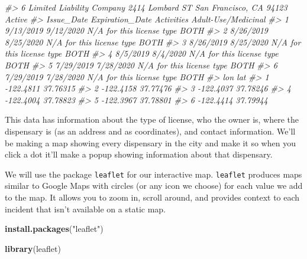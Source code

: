 \documentclass[
  12pt,
]{book}
\newenvironment{Shaded}{\begin{snugshade}}{\end{snugshade}}
\newcommand{\CommentTok}[1]{\textcolor[rgb]{0.37,0.37,0.37}{\textit{#1}}}
\newcommand{\KeywordTok}[1]{\textcolor[rgb]{0.27,0.27,0.27}{\textbf{#1}}}
\newcommand{\NormalTok}[1]{#1}
\newcommand{\StringTok}[1]{\textcolor[rgb]{0.5,0.5,0.5}{#1}}
\begin{document}
\begin{Shaded}
\begin{Highlighting}[]
\CommentTok{\#\textgreater{} 6 Limited Liability Company 2414 Lombard ST San Francisco, CA 94123 Active}
\CommentTok{\#\textgreater{}   Issue\_Date Expiration\_Date                Activities Adult{-}Use/Medicinal}
\CommentTok{\#\textgreater{} 1  9/13/2019       9/12/2020 N/A for this license type                BOTH}
\CommentTok{\#\textgreater{} 2  8/26/2019       8/25/2020 N/A for this license type                BOTH}
\CommentTok{\#\textgreater{} 3  8/26/2019       8/25/2020 N/A for this license type                BOTH}
\CommentTok{\#\textgreater{} 4   8/5/2019        8/4/2020 N/A for this license type                BOTH}
\CommentTok{\#\textgreater{} 5  7/29/2019       7/28/2020 N/A for this license type                BOTH}
\CommentTok{\#\textgreater{} 6  7/29/2019       7/28/2020 N/A for this license type                BOTH}
\CommentTok{\#\textgreater{}         lon      lat}
\CommentTok{\#\textgreater{} 1 {-}122.4811 37.76315}
\CommentTok{\#\textgreater{} 2 {-}122.4158 37.77476}
\CommentTok{\#\textgreater{} 3 {-}122.4037 37.78246}
\CommentTok{\#\textgreater{} 4 {-}122.4004 37.78823}
\CommentTok{\#\textgreater{} 5 {-}122.3967 37.78801}
\CommentTok{\#\textgreater{} 6 {-}122.4414 37.79944}
\end{Highlighting}
\end{Shaded}

This data has information about the type of license, who the owner is, where the dispensary is (as an address and as coordinates), and contact information. We'll be making a map showing every dispensary in the city and make it so when you click a dot it'll make a popup showing information about that dispensary.

We will use the package \texttt{leaflet} for our interactive map. \texttt{leaflet} produces maps similar to Google Maps with circles (or any icon we choose) for each value we add to the map. It allows you to zoom in, scroll around, and provides context to each incident that isn't available on a static map.

\begin{Shaded}
\begin{Highlighting}[]
\KeywordTok{install.packages}\NormalTok{(}\StringTok{"leaflet"}\NormalTok{)}
\end{Highlighting}
\end{Shaded}

\begin{Shaded}
\begin{Highlighting}[]
\KeywordTok{library}\NormalTok{(leaflet)}
\end{Highlighting}
\end{Shaded}
\end{document}
